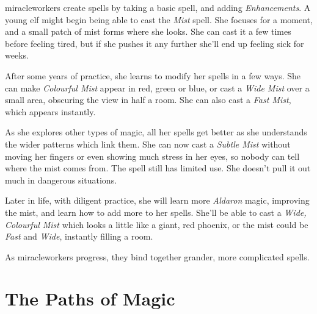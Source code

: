 {\begin{figure*}[b!]
\begin{boxtable}[lp{.25\textwidth}X]
\end{boxtable}

\end{figure*}

\begin{multicols}{2}

\noindent
\Glspl{miracleworker} create spells by taking a basic spell, and adding \textit{Enhancements}.
A young elf might begin being able to cast the \textit{Mist} spell.
She focuses for a moment, and a small patch of mist forms where she looks.
She can cast it a few times before feeling tired, but if she pushes it any further she'll end up feeling sick for weeks.

After some years of practice, she learns to modify her spells in a few ways.
She can make \textit{Colourful Mist} appear in red, green or blue, or cast a \textit{Wide Mist} over a small area, obscuring the view in half a room.
She can also cast a \textit{Fast Mist}, which appears instantly.

As she explores other types of magic, all her spells get better as she understands the wider patterns which link them.
She can now cast a \textit{Subtle Mist} without moving her fingers or even showing much stress in her eyes, so nobody can tell where the mist comes from.
The spell still has limited use.
She doesn't pull it out much in dangerous situations.

Later in life, with diligent practice, she will learn more \textit{Aldaron} magic, improving the mist, and learn how to add more to her spells.
She'll be able to cast a \textit{Wide, Colourful Mist} which looks a little like a giant, red phoenix, or the mist could be \textit{Fast} and \textit{Wide}, instantly filling a room.

As \glspl{miracleworker} progress, they bind together grander, more complicated spells.

\end{multicols}

}{}

\section{The Paths of Magic}

